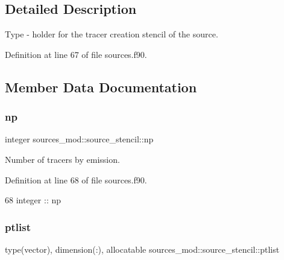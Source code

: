 \subsection{Detailed Description}
Type -\/ holder for the tracer creation stencil of the source. 

Definition at line 67 of file sources.\+f90.



\subsection{Member Data Documentation}
\mbox{\label{structsources__mod_1_1source__stencil_a11ed46a8e923b5902cc02420d88158c5}} 
\subsubsection{\texorpdfstring{np}{np}}
{\footnotesize\ttfamily integer sources\+\_\+mod\+::source\+\_\+stencil\+::np\hspace{0.3cm}{\ttfamily [private]}}



Number of tracers by emission. 



Definition at line 68 of file sources.\+f90.


\begin{DoxyCode}
68         \textcolor{keywordtype}{integer} :: np
\end{DoxyCode}
\mbox{\label{structsources__mod_1_1source__stencil_a154e50e2872650da574d0a1148e3065a}} 
\subsubsection{\texorpdfstring{ptlist}{ptlist}}
{\footnotesize\ttfamily type(vector), dimension(\+:), allocatable sources\+\_\+mod\+::source\+\_\+stencil\+::ptlist\hspace{0.3cm}{\ttfamily [private]}}




